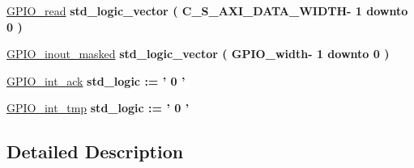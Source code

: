 \begin{DoxyCompactItemize}
\item 
\hypertarget{group__my_g_p_i_o_gabeb68e84704e9c7d486f933c78f98d03}{\hyperlink{group__my_g_p_i_o_gabeb68e84704e9c7d486f933c78f98d03}{G\+P\+I\+O\+\_\+read} {\bfseries \textcolor{vhdlchar}{std\+\_\+logic\+\_\+vector}\textcolor{vhdlchar}{ }\textcolor{vhdlchar}{(}\textcolor{vhdlchar}{ }\textcolor{vhdlchar}{ }\textcolor{vhdlchar}{ }\textcolor{vhdlchar}{ }\textcolor{vhdlchar}{C\+\_\+\+S\+\_\+\+A\+X\+I\+\_\+\+D\+A\+T\+A\+\_\+\+W\+I\+D\+T\+H}\textcolor{vhdlchar}{-\/}\textcolor{vhdlchar}{ } \textcolor{vhdldigit}{1} \textcolor{vhdlchar}{ }\textcolor{vhdlchar}{downto}\textcolor{vhdlchar}{ }\textcolor{vhdlchar}{ } \textcolor{vhdldigit}{0} \textcolor{vhdlchar}{ }\textcolor{vhdlchar}{)}\textcolor{vhdlchar}{ }} }\label{group__my_g_p_i_o_gabeb68e84704e9c7d486f933c78f98d03}

\item 
\hypertarget{group__my_g_p_i_o_ga83042d2ece1f3e1a3258d16a516201c1}{\hyperlink{group__my_g_p_i_o_ga83042d2ece1f3e1a3258d16a516201c1}{G\+P\+I\+O\+\_\+inout\+\_\+masked} {\bfseries \textcolor{vhdlchar}{std\+\_\+logic\+\_\+vector}\textcolor{vhdlchar}{ }\textcolor{vhdlchar}{(}\textcolor{vhdlchar}{ }\textcolor{vhdlchar}{ }\textcolor{vhdlchar}{ }\textcolor{vhdlchar}{ }\textcolor{vhdlchar}{G\+P\+I\+O\+\_\+width}\textcolor{vhdlchar}{-\/}\textcolor{vhdlchar}{ } \textcolor{vhdldigit}{1} \textcolor{vhdlchar}{ }\textcolor{vhdlchar}{downto}\textcolor{vhdlchar}{ }\textcolor{vhdlchar}{ } \textcolor{vhdldigit}{0} \textcolor{vhdlchar}{ }\textcolor{vhdlchar}{)}\textcolor{vhdlchar}{ }} }\label{group__my_g_p_i_o_ga83042d2ece1f3e1a3258d16a516201c1}

\item 
\hypertarget{group__my_g_p_i_o_gae8a6d7c3130cf923b3f5ba5409406e81}{\hyperlink{group__my_g_p_i_o_gae8a6d7c3130cf923b3f5ba5409406e81}{G\+P\+I\+O\+\_\+int\+\_\+ack} {\bfseries \textcolor{vhdlchar}{std\+\_\+logic}\textcolor{vhdlchar}{ }\textcolor{vhdlchar}{ }\textcolor{vhdlchar}{\+:}\textcolor{vhdlchar}{=}\textcolor{vhdlchar}{ }\textcolor{vhdlchar}{ }\textcolor{vhdlchar}{'}\textcolor{vhdlchar}{ } \textcolor{vhdldigit}{0} \textcolor{vhdlchar}{ }\textcolor{vhdlchar}{'}\textcolor{vhdlchar}{ }} }\label{group__my_g_p_i_o_gae8a6d7c3130cf923b3f5ba5409406e81}

\item 
\hypertarget{group__my_g_p_i_o_ga7ddc27ce3ab4572421b8eb115d2c9753}{\hyperlink{group__my_g_p_i_o_ga7ddc27ce3ab4572421b8eb115d2c9753}{G\+P\+I\+O\+\_\+int\+\_\+tmp} {\bfseries \textcolor{vhdlchar}{std\+\_\+logic}\textcolor{vhdlchar}{ }\textcolor{vhdlchar}{ }\textcolor{vhdlchar}{\+:}\textcolor{vhdlchar}{=}\textcolor{vhdlchar}{ }\textcolor{vhdlchar}{ }\textcolor{vhdlchar}{'}\textcolor{vhdlchar}{ } \textcolor{vhdldigit}{0} \textcolor{vhdlchar}{ }\textcolor{vhdlchar}{'}\textcolor{vhdlchar}{ }} }\label{group__my_g_p_i_o_ga7ddc27ce3ab4572421b8eb115d2c9753}

\end{DoxyCompactItemize}


\subsection{Detailed Description}
